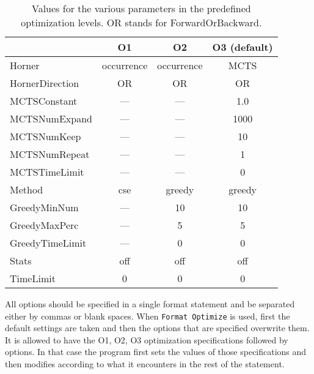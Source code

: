 { \small
\begin{table}[!ht]
\centering
\begin{tabular}{|l|c|c|c|}
\hline
                &     O1      &    O2       & O3 (default) \\
 \hline
Horner          &  occurrence &  occurrence &   MCTS   \\
HornerDirection &     OR      &      OR     &    OR    \\
MCTSConstant    &    ---      &     ---     &   1.0    \\
MCTSNumExpand   &    ---      &     ---     &  1000    \\
MCTSNumKeep     &    ---      &     ---     &   10     \\
MCTSNumRepeat   &    ---      &     ---     &    1     \\
MCTSTimeLimit   &    ---      &     ---     &    0     \\
Method          &    cse      &    greedy   &  greedy  \\
GreedyMinNum    &    ---      &     10      &   10     \\
GreedyMaxPerc   &    ---      &      5      &    5     \\
GreedyTimeLimit &    ---      &      0      &    0     \\
Stats           &    off      &     off     &   off    \\ 
TimeLimit       &     0       &      0      &    0     \\
\hline
\end{tabular}
\caption{Values for the various parameters in the predefined
  optimization levels. OR stands for ForwardOrBackward.}
\label{tbl:defaults}
\end{table}
} 

All options should be specified in a single format statement and be
separated either by commas or blank spaces. When
\verb|Format Optimize| is used, first the default settings are taken
and then the options that are specified overwrite them. It is allowed
to have the O1, O2, O3 optimization specifications followed by
options. In that case the program first sets the values of those
specifications and then modifies according to what it encounters in
the rest of the statement.

